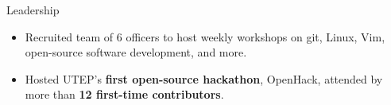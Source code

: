 \documentclass{resume} %
\begin{document}
\begin{workSection}{Leadership}
    
    \customItem[
    	title=President \& Founder - \href{https://www.instagram.com/foss.utep/}{\textbf{Free and Open Source Software Club at UTEP} \faExternalLink},
    	duration=December 2023 - Present
    ]
    \begin{itemize}
    	\vspace{-0.5em}
    	\itemsep -6pt {}
    	\item Recruited team of 6 officers to host weekly workshops on git, Linux, Vim, open-source software development, and more.
		\item Hosted UTEP's \textbf{first open-source hackathon}, OpenHack, attended by more than \textbf{12 first-time contributors}.
    \end{itemize}


\end{workSection}
\end{document}
